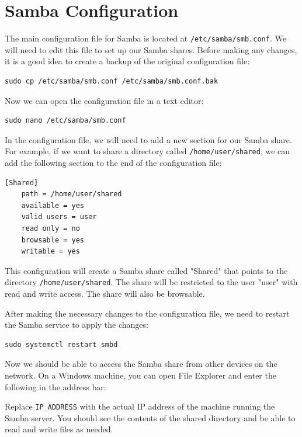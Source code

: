 \section{Samba Configuration}
\label{sec:samba:config}

The main configuration file for Samba is located at \texttt{/etc/samba/smb.conf}. We will need to edit this file to set up our Samba shares. Before making any changes, it is a good idea to create a backup of the original configuration file:
\begin{lstlisting}
sudo cp /etc/samba/smb.conf /etc/samba/smb.conf.bak
\end{lstlisting}

Now we can open the configuration file in a text editor:
\begin{lstlisting}
sudo nano /etc/samba/smb.conf
\end{lstlisting}

In the configuration file, we will need to add a new section for our Samba share. For example, if we want to share a directory called \texttt{/home/user/shared}, we can add the following section to the end of the configuration file:
\begin{lstlisting}
[Shared]
    path = /home/user/shared
    available = yes
    valid users = user
    read only = no
    browsable = yes
    writable = yes
\end{lstlisting}

This configuration will create a Samba share called "Shared" that points to the directory \texttt{/home/user/shared}. The share will be restricted to the user "user" with read and write access. The share will also be browsable.

After making the necessary changes to the configuration file, we need to restart the Samba service to apply the changes:
\begin{lstlisting}
sudo systemctl restart smbd
\end{lstlisting}

Now we should be able to access the Samba share from other devices on the network. On a Windows machine, you can open File Explorer and enter the following in the address bar:


Replace \texttt{IP\_ADDRESS} with the actual IP address of the machine running the Samba server. You should see the contents of the shared directory and be able to read and write files as needed.

